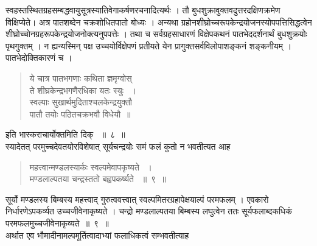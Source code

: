\documentclass[11pt, openany]{book}
\begin{document}
\begin{sloppypar}
\noindent स्वहस्तस्थितग्रहसम्बद्धवायुसूत्रस्यातिवेगाकर्षणरचनादित्यर्थः । तौ बुधशुक्रावुक्तवदुत्तरदक्षिणक्रमेण विक्षिप्येते। अत्र पातशब्देन चक्रशोधितपातो बोध्यः । अन्यथा ग्रहोनशीघ्रोच्चरूपकेन्द्रयोजनस्योपपत्तिसिद्धत्वेन शीघ्रोच्चोनग्रहरूपकेन्द्रयोजनोक्त्यनुपपत्तेः । तथा च सर्वग्रहसाधारणं विक्षेपकथनं पातभेददर्शनार्थं बुधशुक्रयोः पृथगुक्तम् । न ह्यन्यस्मिन् पक्ष उच्चयोर्विक्षेपणं प्रतीयते येन प्रागुक्तसर्वविलोपाशङ्कनं शङ्कनीयम् । पातभेदोक्तिकारणं च ।
\end{sloppypar}
\begin{quote}

{\qt ये चात्र पातभगणाः कथिता ज्ञमृग्वोस्\\
ते शीघ्रकेन्द्रभगणैरधिका यतः स्युः ~।\\
स्वल्पाः सुखार्थमुदिताश्चलकेन्द्रयुक्तौ\\
पातौ तयोः पठितचक्रभवौ विधेयौ~॥}
\end{quote}
\begin{sloppypar}
इति भास्कराचार्योक्तमिति दिक् ~॥~८~॥\\
\noindent स्यादेतत् परमुच्चदेवतयोरविशेषात् सूर्यचन्द्रयोः समं फलं कुतो न भवतीत्यत आह\textendash
\end{sloppypar}
\begin{quote}

{\ssi महत्त्वान्मण्डलस्यार्कः स्वल्पमेवापकृष्यते ~।\\
मण्डलाल्पतया चन्द्रस्ततो बह्वपकर्ष्यते ~॥~९~॥}
\end{quote}
\begin{sloppypar}
सूर्यो मण्डलस्य बिम्बस्य महत्त्वाद् गुरुत्ववत्त्वात् स्वल्पमितरग्रहापेक्षयाल्पं परमफलम् । एवकारो निर्धारणेऽपकर्व्यत उच्चजीवेनाकृष्यते । चन्द्रो मण्डलाल्पतया बिम्बस्य लघुत्वेन ततः सूर्यफलाब्दकधिकं परमफलमुच्चजीवेनाकृव्यते~॥~९~॥\\
\noindent अर्थात एव भौमादीनामल्पमूर्तित्वादाभ्यां फलाधिकत्वं सम्भवतीत्याह\textendash
\end{sloppypar}

\newpage
\end{document}
